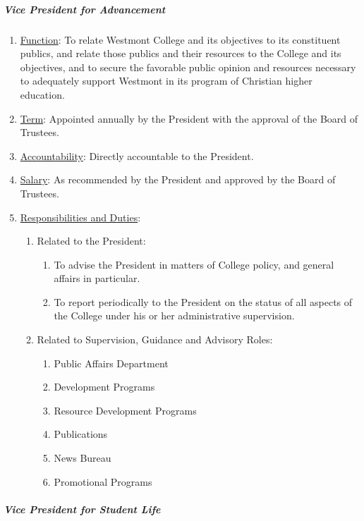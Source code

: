 \documentclass[letterpaper, 11pt]{article}
\begin{document}
				\subparagraph{Vice President for Advancement}
					\begin{enumerate}
						\item{\underline{Function}:  To relate Westmont College and its objectives to its constituent publics, and relate those publics and their resources to the College and its objectives, and to secure the favorable public opinion and resources necessary to adequately support Westmont in its program of Christian higher education.}
						\item{\underline{Term}:  Appointed annually by the President with the approval of the Board of Trustees.}
						\item{\underline{Accountability}:  Directly accountable to the President.}
						\item{\underline{Salary}:  As recommended by the President and approved by the Board of Trustees.}
						\item{\underline{Responsibilities and Duties}:
							\begin{enumerate}
								\item{Related to the President:
									\begin{enumerate}
										\item{To advise the President in matters of College policy, and general affairs in particular.}
										\item{To report periodically to the President on the status of all aspects of the College under his or her administrative supervision.}
									\end{enumerate}
								}
								\item{Related to Supervision, Guidance and Advisory Roles:
									\begin{enumerate}
										\item{Public Affairs Department}
										\item{Development Programs}
										\item{Resource Development Programs}
										\item{Publications}
										\item{News Bureau}
										\item{Promotional Programs}
									\end{enumerate}
								}
							\end{enumerate}
						}
					\end{enumerate}
				\subparagraph{Vice President for Student Life}
\end{document}

